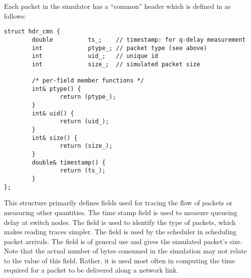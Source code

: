 Each packet in the simulator has a ``common''
header which is defined in  as follows:
\begin{small}
\begin{verbatim}
struct hdr_cmn {
        double          ts_;    // timestamp: for q-delay measurement
        int             ptype_; // packet type (see above)
        int             uid_;   // unique id
        int             size_;  // simulated packet size

        /* per-field member functions */
        int& ptype() {
                return (ptype_);
        }
        int& uid() {
                return (uid_);
        }
        int& size() {
                return (size_);
        }
        double& timestamp() {
                return (ts_);
        }
};
\end{verbatim}
\end{small}
This structure primarily defines fields used for tracing
the flow of packets or measuring other quantities.
The time stamp field is used to measure queueing delay
at switch nodes.
The  field is used to identify the
type of packets, which makes reading traces simpler.
The  field is used by the scheduler in scheduling
packet arrivals.
The  field is of general use and gives the
simulated packet's size.
Note that the actual number of bytes consumed in the simulation
may not relate to the value of this field.
Rather, it is used most often in computing the time required for a packet
to be delivered along a network link.

\subsubsection{}

